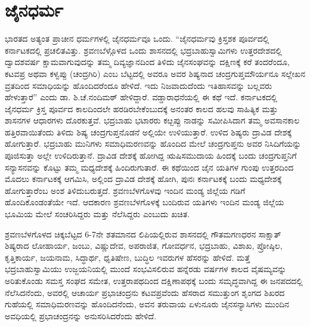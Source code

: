 \section*{ಜೈನಧರ್ಮ}

ಭಾರತದ ಅತ್ಯಂತ ಪ್ರಾಚೀನ ಧರ್ಮಗಳಲ್ಲಿ ಜೈನಧರ್ಮವೂ ಒಂದು. “ಜೈನಧರ್ಮವು ಕ್ರಿಸ್ತಶಕ ಪೂರ್ವದಲ್ಲಿ ಕರ್ನಾಟಕದಲ್ಲಿ ಪ್ರಚಲಿತವಿತ್ತು. ಶ್ರವಣಬೆಳ್ಗೊಳದ ಒಂದು ಶಾಸನದಲ್ಲಿ ಭದ್ರಬಾಹುಸ್ವಾಮಿಗಳು ಉತ್ತರದೇಶದಲ್ಲಿ ದ್ವಾದಶವರ್ಷ ಕ್ಷಾಮವಾಗು\-ವುದನ್ನು ತಮ್ಮ ದಿವ್ಯಜ್ಞಾನದಿಂದ ತಿಳಿದು ಜೈನಸಂಘವನ್ನು ದಕ್ಷಿಣಕ್ಕೆ ಕರೆ ತಂದರೆಂದೂ, ಕಟವಪ್ರ ಅಥವಾ ಕಳ್ವಪ್ಪು (ಚಂದ್ರಗಿರಿ) ಎಂಬ ಬೆಟ್ಟದಲ್ಲಿ ಅವರೂ ಅವರ ಶಿಷ್ಯನಾದ ಚಂದ್ರಗುಪ್ತಮೌರ್ಯನೂ ಸಲ್ಲೇಖನ ವ್ರತದಿಂದ ಸಮಾಧಿಯನ್ನು ಹೊಂದಿದರೆಂದೂ ಹೇಳಿದೆ. ಇದು ನಿಜವಾದುದೆಂದು ಇತಿಹಾಸವನ್ನು ಬಲ್ಲವರು ಹೇಳುತ್ತಾರೆ” ಎಂದು ಡಾ. ಶಿ.ಚೆ.ನಂದಿಮಠ್​ ಹೇಳಿದ್ದಾರೆ. ವಡ್ಡಾರಾಧನೆಯಲ್ಲಿ ಈ ಕಥೆ ಇದೆ. ಕರ್ನಾಟಕದಲ್ಲಿ ಜೈನಧರ್ಮ ಕ್ರಿಸ್ತ ಪೂರ್ವದ ಕಾಲದಿಂದಲೇ ಹರಡಿರಬೇಕೆಂಬುದಕ್ಕೆ ಅನಂತರ ಕಾಲದ ಹಲವು ಸಾಹಿತ್ಯಿಕ ಮತ್ತು ಶಾಸನಗಳ ಆಧಾರಗಳು ದೊರಕುತ್ತವೆ. ಭದ್ರಬಾಹು ಭಟಾರರು ಕೞ್ಬಪ್ಪು ನಾಡನ್ನು ಸಮೀಪಿಸಿದಾಗ ತಮ್ಮ ಅವಸಾನಕಾಲ ಹತ್ತಿರವಾಯಿತೆಂದು ತಿಳಿದು ಶಿಷ್ಯ ಚಂದ್ರಗುಪ್ತನೊಡನೆ ಅಲ್ಲಿಯೇ ಉಳಿಯುತ್ತಾರೆ. ಉಳಿದ ಶಿಷ್ಯರು ದ್ರಾವಿಡ ದೇಶಕ್ಕೆ ಹೋಗುತ್ತಾರೆ. ಭದ್ರಬಾಹು ಮುನಿಗಳು ಸಮಾಧಿಮರಣವನ್ನು ಹೊಂದಿದ ಮೇಲೆ ಚಂದ್ರಗುಪ್ತನು ಅವರ ನಿಸಿದಿಗೆಯನ್ನು ಪೂಜಿಸುತ್ತಾ ಅಲ್ಲೇ ಉಳಿದಿರುತ್ತಾನೆ. ದ್ರಾವಿಡ ದೇಶಕ್ಕೆ ಹೋಗಿದ್ದ ಋಷಿಸಮುದಾಯ ಹಿಂದಕ್ಕೆ ಬಂದು ಚಂದ್ರಗುಪ್ತನಿಗೆ ಸನ್ಯಾಸನವನ್ನು ಕೊಟ್ಟು ತಮ್ಮ ಮಧ್ಯದೇಶಕ್ಕೆ ಹಿಂದಿರುಗುತಾರೆ. ಈ ಕಥೆಯಿಂದ ಜೈನ ಯತಿಗಳ ಗುಂಪು ಉತ್ತರದಿಂದ ಮೊದಲು ಕರ್ನಾಟಕಕ್ಕೆ ಆಗಮಿಸಿ, ಅಲ್ಲಿಂದ ದ್ರಾವಿಡ ದೇಶಕ್ಕೆ ಹೋಗಿ, ಪುನಃ ಕರ್ನಾಟಕಕ್ಕೆ ಬಂದು ಮಧ್ಯದೇಶಕ್ಕೆ ಹೋಗುತ್ತಾರೆಂಬ ಅಂಶ ತಿಳಿದುಬರುತ್ತದೆ. ಶ್ರವಣಬೆಳಗೊಳವು ಇಂದಿನ ಮಂಡ್ಯ ಜಿಲ್ಲೆಯ ಗಡಿಗೆ ಹೊಂದಿಕೊಂಡಂತೆಯೇ ಇದೆ. ಆದಕಾರಣ ಶ್ರವಣಬೆಳಗೊಳಕ್ಕೆ ಬಂದಿರುವ ಯತಿಗಳು ಇಂದಿನ ಮಂಡ್ಯ ಜಿಲ್ಲೆಯ ಭೂಮಿಯ ಮೇಲೆ ಸಂಚರಿಸಿದ್ದರು ಮತ್ತು ನೆಲೆಸಿದ್ದರು ಎಂಬುದು ಖಚಿತ.

ಶ್ರವಣಬೆಳಗೊಳದ ಚಿಕ್ಕಬೆಟ್ಟದ 6-7ನೇ ಶತಮಾನದ ಲಿಪಿಯಲ್ಲಿರುವ ಶಾಸನದಲ್ಲಿ ಗೌತಮಗಣಧರನ ಸಾಕ್ಷಾತ್​ ಶಿಷ್ಯರಾದ ಲೋಹಾರ್ಯ, ಜಂಬು, ವಿಷ್ಣುದೇವ, ಅಪರಾಜಿತ, ಗೋವರ್ಧನ, ಭದ್ರಬಾಹು, ವಿಶಾಖ, ಪ್ರೋಷ್ಠಿಲ, ಕೃತ್ತಿಕಾರ್ಯ, ಜಯನಾಮ, ಸಿದ್ಧಾರ್ಥ, ಧೃತಿಷೇಣ, ಬುದ್ಧಿಲ ಇವರುಗಳ ಹೆಸರನ್ನು ಹೇಳಿದೆ. ಮತ್ತೆ ಭದ್ರಬಾಹುಸ್ವಾಮಿಯು ಉಜ್ಜಯನಿಯಲ್ಲಿ ಮುಂದೆ ಸಂಭವಿಸಲಿರುವ ಹನ್ನೆರಡು ವರ್ಷಗಳ ಕಾಲದ ವೈಷಮ್ಯವನ್ನು ಅರಿತುಕೊಂಡು ಸಮಸ್ತ ಸಂಘದ ಸಮೇತ, ಉತ್ತರಾಪಥದಿಂದ ದಕ್ಷಿಣಾಪಥಕ್ಕೆ ಬಂದು ಸಮೃದ್ಧವಾಗಿದ್ದ ಈ ಜನಪದದಲ್ಲಿ ನೆಲೆಸಿದನೆಂದು, ಅವರಲ್ಲಿ ಆಚಾರ್ಯ ಪ್ರಭಾಚಂದ್ರನು ಕಟವಪ್ರವೆಂದು ಹೆಸರಾದ ಸಮುತ್ತುಂಗ ಶೃಂಗದ ಶಿಖರದ ಗುಹೆಯಲ್ಲಿ ಸಮಾಧಿಮರಣವನ್ನು ಹೊಂದಿದನೆಂದು, ಅವನ ತರುವಾಯ ಏಳುನೂರು ಜೈನಸನ್ಯಾಸಿಗಳು ಮುಂದಿನ ಅವಧಿಯಲ್ಲಿ ಪ್ರಭಾಚಂದ್ರನನ್ನು ಅನುಸರಿಸಿದರೆಂದು ಹೇಳಿದೆ.

